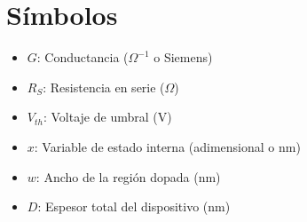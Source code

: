 \section*{Símbolos}
\begin{itemize}
    \item $G$: Conductancia ($\Omega^{-1}$ o Siemens)
    \item $R_S$: Resistencia en serie ($\Omega$)
    \item $V_{th}$: Voltaje de umbral (V)
    \item $x$: Variable de estado interna (adimensional o nm)
    \item $w$: Ancho de la región dopada (nm)
    \item $D$: Espesor total del dispositivo (nm)
\end{itemize}
